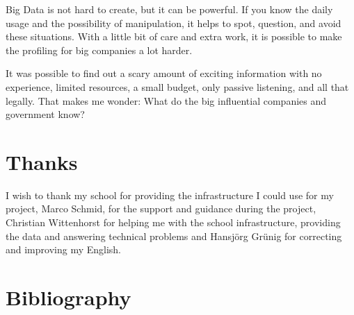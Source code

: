 \documentclass[paper=a4, fontsize=11pt]{article}
\begin{document}
Big Data is not hard to create, but it can be powerful. If you know the daily usage and the possibility of manipulation, it helps to spot, question, and avoid these situations. With a little bit of care and extra work, it is possible to make the profiling for big companies a lot harder.

It was possible to find out a scary amount of exciting information with no experience, limited resources, a small budget, only passive listening, and all that legally.
That makes me wonder: What do the big influential companies and government know?


\section{Thanks}

I wish to thank my school for providing the infrastructure I could use for my project, Marco Schmid, for the support and guidance during the project, Christian Wittenhorst for helping me with the school infrastructure, providing the data and answering technical problems and Hansjörg Grünig for correcting and improving my English.

\section{Bibliography}
\printbibliography


\listoffigures
\end{document}
